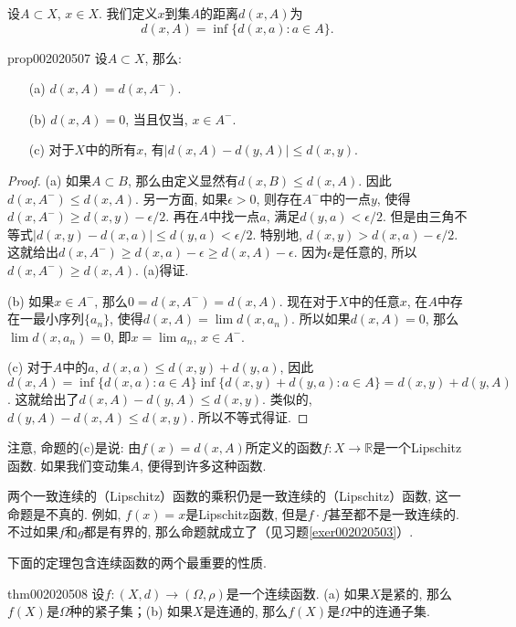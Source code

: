 设$A \subset X$, $x \in X$. 我们定义$x$到集$A$的距离$d(x, A)$为
\[
d(x, A) = \inf\{d(x, a) : a \in A\}.
\]

\begin{proposition}{}{prop002020507}
设$A \subset X$, 那么: 
\begin{enumerate}
\item[(a)]$d(x, A) = d(x, A^-)$. 
\item[(b)]$d(x, A) = 0$, 当且仅当, $x \in A^-$. 
\item[(c)]对于$X$中的所有$x$, 有$|d(x, A) - d(y, A)| \le d(x, y)$. 
\end{enumerate}
\end{proposition}

\begin{proof}
(a) 如果$A \subset B$, 那么由定义显然有$d(x, B) \le d(x, A)$. 因此$d(x, A^-) \le d(x, A)$. 另一方面, 如果$\epsilon > 0$, 则存在$A^-$中的一点$y$, 使得$d(x, A^-) \ge d(x, y) - \epsilon / 2$. 再在$A$中找一点$a$, 满足$d(y, a) < \epsilon/2$. 但是由三角不等式$|d(x, y) - d(x, a)| \le d(y, a) < \epsilon/2$. 特别地, $d(x, y) > d(x, a) - \epsilon/2$. 这就给出$d(x, A^-) \ge d(x, a) - \epsilon \ge d(x, A) - \epsilon$. 因为$\epsilon$是任意的, 所以$d(x, A^-) \ge d(x, A)$. (a)得证. 

(b) 如果$x \in A^-$, 那么$0 = d(x, A^-) = d(x, A)$. 现在对于$X$中的任意$x$, 在$A$中存在一最小序列$\{a_n\}$, 使得$d(x, A) = \lim{d(x, a_n)}$. 所以如果$d(x, A) = 0$, 那么$\lim{d(x, a_n)} = 0$, 即$x = \lim{a_n}$, $x \in A^-$. 

(c) 对于$A$中的$a$, $d(x, a) \le d(x, y) + d(y, a)$, 因此$d(x, A) = \inf\{d(x, a):a \in A\} \inf\{d(x, y) + d(y, a):a \in A\} = d(x, y) + d(y, A)$. 这就给出了$d(x, A) - d(y, A) \le d(x, y)$. 类似的, $d(y, A) - d(x, A) \le d(x, y)$. 所以不等式得证. 
\end{proof}

注意, 命题的(c)是说: 由$f(x)=d(x, A)$所定义的函数$f: X \to \mathbb{R}$是一个Lipschitz函数. 如果我们变动集$A$, 便得到许多这种函数. 

两个一致连续的（Lipschitz）函数的乘积仍是一致连续的（Lipschitz）函数, 这一命题是不真的. 例如, $f(x)=x$是Lipschitz函数, 但是$f \cdot f$甚至都不是一致连续的. 不过如果$f$和$g$都是有界的, 那么命题就成立了（见习题\ref{exer002020503}）. 

下面的定理包含连续函数的两个最重要的性质. 

\begin{theorem}{}{thm002020508}
设$f:(X, d) \to (\Omega, \rho)$是一个连续函数. (a) 如果$X$是紧的, 那么$f(X)$是$\Omega$种的紧子集；(b) 如果$X$是连通的, 那么$f(X)$是$\Omega$中的连通子集. 
\end{theorem}

